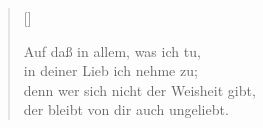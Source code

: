 \begin{center}
\settowidth{\versewidth}{Auf daß in allem, was ich tu,}
\begin{verse}[\versewidth]

 Auf daß in allem, was ich tu,\\
in deiner Lieb ich nehme zu;\\
denn wer sich nicht der Weisheit gibt,\\
der bleibt von dir auch ungeliebt.

  
\end{verse}
\end{center}


